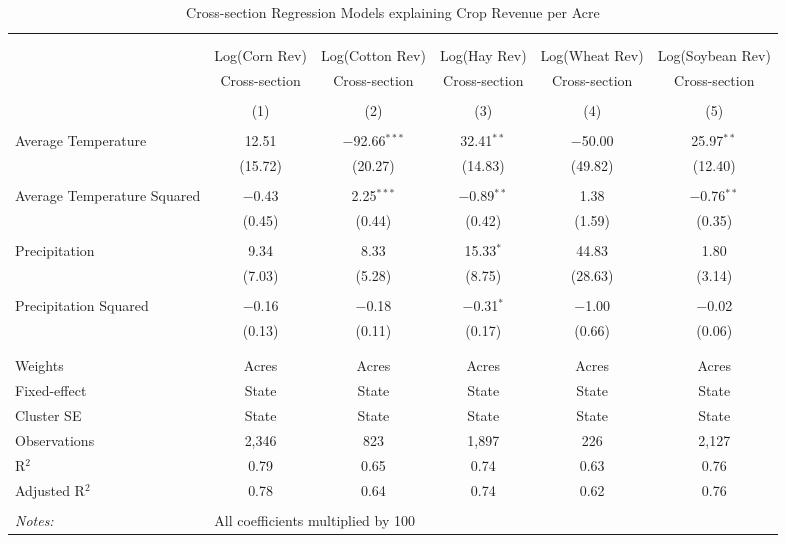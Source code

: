 \documentclass[10pt]{article}
\begin{document}
\begin{table}[!htbp] \centering 
  \caption{Cross-section Regression Models explaining Crop Revenue per Acre} 
  \label{} 
\footnotesize 
\begin{tabular}{@{\extracolsep{5pt}}lccccc} 
\\[-1.8ex]\hline 
\hline \\[-1.8ex] 
\\[-1.8ex] & Log(Corn Rev) & Log(Cotton Rev) & Log(Hay Rev) & Log(Wheat Rev) & Log(Soybean Rev) \\ 
 & Cross-section & Cross-section & Cross-section & Cross-section & Cross-section \\ 
\\[-1.8ex] & (1) & (2) & (3) & (4) & (5)\\ 
\hline \\[-1.8ex] 
 Average Temperature & 12.51 & $-$92.66$^{***}$ & 32.41$^{**}$ & $-$50.00 & 25.97$^{**}$ \\ 
  & (15.72) & (20.27) & (14.83) & (49.82) & (12.40) \\ 
  & & & & & \\ 
 Average Temperature Squared & $-$0.43 & 2.25$^{***}$ & $-$0.89$^{**}$ & 1.38 & $-$0.76$^{**}$ \\ 
  & (0.45) & (0.44) & (0.42) & (1.59) & (0.35) \\ 
  & & & & & \\ 
 Precipitation & 9.34 & 8.33 & 15.33$^{*}$ & 44.83 & 1.80 \\ 
  & (7.03) & (5.28) & (8.75) & (28.63) & (3.14) \\ 
  & & & & & \\ 
 Precipitation Squared & $-$0.16 & $-$0.18 & $-$0.31$^{*}$ & $-$1.00 & $-$0.02 \\ 
  & (0.13) & (0.11) & (0.17) & (0.66) & (0.06) \\ 
  & & & & & \\ 
\hline \\[-1.8ex] 
Weights & Acres & Acres & Acres & Acres & Acres \\ 
Fixed-effect & State & State & State & State & State \\ 
Cluster SE & State & State & State & State & State \\ 
Observations & 2,346 & 823 & 1,897 & 226 & 2,127 \\ 
R$^{2}$ & 0.79 & 0.65 & 0.74 & 0.63 & 0.76 \\ 
Adjusted R$^{2}$ & 0.78 & 0.64 & 0.74 & 0.62 & 0.76 \\ 
\hline 
\hline \\[-1.8ex] 
\textit{Notes:} & \multicolumn{5}{l}{All coefficients multiplied by 100} \\ 
\end{tabular} 
\end{table} 
\end{document}
